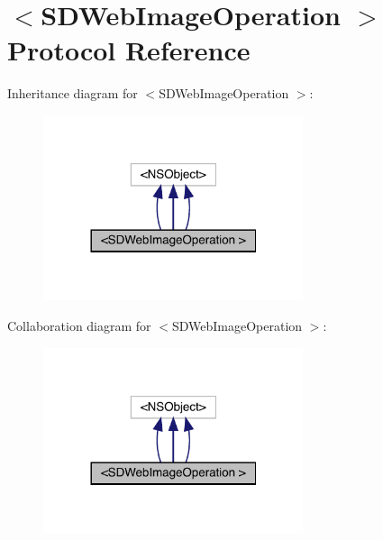 \hypertarget{protocol_s_d_web_image_operation_01-p}{}\section{$<$S\+D\+Web\+Image\+Operation $>$ Protocol Reference}
\label{protocol_s_d_web_image_operation_01-p}


Inheritance diagram for $<$S\+D\+Web\+Image\+Operation $>$\+:\nopagebreak
\begin{figure}[H]
\begin{center}
\leavevmode
\includegraphics[width=216pt]{protocol_s_d_web_image_operation_01-p__inherit__graph}
\end{center}
\end{figure}


Collaboration diagram for $<$S\+D\+Web\+Image\+Operation $>$\+:\nopagebreak
\begin{figure}[H]
\begin{center}
\leavevmode
\includegraphics[width=216pt]{protocol_s_d_web_image_operation_01-p__coll__graph}
\end{center}
\end{figure}
